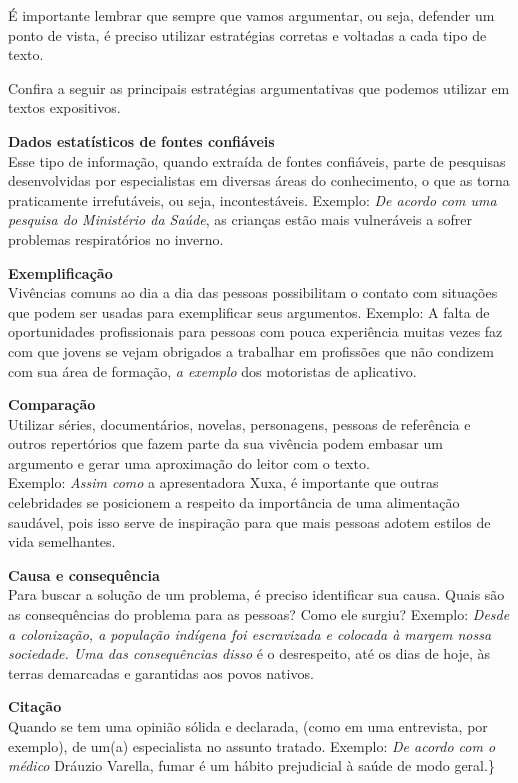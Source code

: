 {É importante lembrar que sempre que vamos argumentar, ou seja, defender
um ponto de vista, é preciso utilizar estratégias corretas e voltadas a
cada tipo de texto.

Confira a seguir as principais estratégias argumentativas que podemos
utilizar em textos expositivos.

\textbf{Dados estatísticos de fontes confiáveis}\\
Esse tipo de informação, quando extraída de fontes confiáveis, parte de
pesquisas desenvolvidas por especialistas em diversas áreas do
conhecimento, o que as torna praticamente irrefutáveis, ou seja,
incontestáveis. Exemplo: \emph{De acordo com uma pesquisa do Ministério
da Saúde}, as crianças estão mais vulneráveis a sofrer problemas
respiratórios no inverno.

\textbf{Exemplificação}\\
Vivências comuns ao dia a dia das pessoas possibilitam o contato com
situações que podem ser usadas para exemplificar seus argumentos.
Exemplo: A falta de oportunidades profissionais para pessoas com pouca
experiência muitas vezes faz com que jovens se vejam obrigados a
trabalhar em profissões que não condizem com sua área de formação,
\emph{a exemplo} dos motoristas de aplicativo.

\textbf{Comparação}\\
Utilizar séries, documentários, novelas, personagens, pessoas de
referência e outros repertórios que fazem parte da sua vivência podem
embasar um argumento e gerar uma aproximação do leitor com o texto.\\
Exemplo: \emph{Assim como} a apresentadora Xuxa, é importante que outras
celebridades se posicionem a respeito da importância de uma alimentação
saudável, pois isso serve de inspiração para que mais pessoas adotem
estilos de vida semelhantes.

\textbf{Causa e consequência}\\
Para buscar a solução de um problema, é preciso identificar sua causa.
Quais são as consequências do problema para as pessoas? Como ele surgiu?
Exemplo: \emph{Desde a colonização, a população indígena foi escravizada
e colocada à margem nossa sociedade. Uma das consequências disso} é o
desrespeito, até os dias de hoje, às terras demarcadas e garantidas aos
povos nativos.

\textbf{Citação}\\
Quando se tem uma opinião sólida e declarada, (como em uma entrevista,
por exemplo), de um(a) especialista no assunto tratado. Exemplo:
\emph{De acordo com o médico} Dráuzio Varella, fumar é um hábito
prejudicial à saúde de modo geral.\}

}
